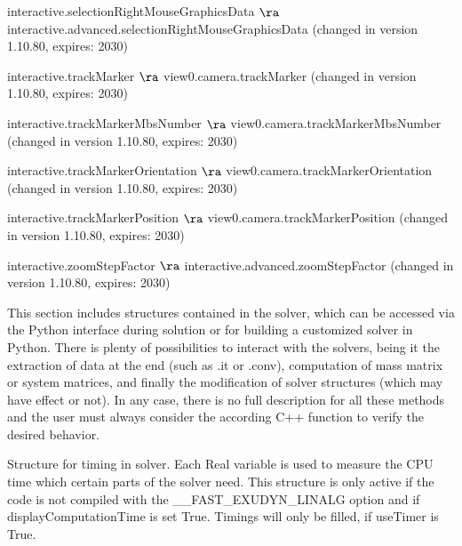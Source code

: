   \item interactive.selectionRightMouseGraphicsData $\ra$ interactive.advanced.selectionRightMouseGraphicsData (changed in version 1.10.80, expires: 2030)
  \item interactive.trackMarker $\ra$ view0.camera.trackMarker (changed in version 1.10.80, expires: 2030)
  \item interactive.trackMarkerMbsNumber $\ra$ view0.camera.trackMarkerMbsNumber (changed in version 1.10.80, expires: 2030)
  \item interactive.trackMarkerOrientation $\ra$ view0.camera.trackMarkerOrientation (changed in version 1.10.80, expires: 2030)
  \item interactive.trackMarkerPosition $\ra$ view0.camera.trackMarkerPosition (changed in version 1.10.80, expires: 2030)
  \item interactive.zoomStepFactor $\ra$ interactive.advanced.zoomStepFactor (changed in version 1.10.80, expires: 2030)
\ei


This section includes structures contained in the solver, which can be accessed via the Python interface during solution or for building a customized solver in Python.
There is plenty of possibilities to interact with the solvers, being it the extraction of data at the end (such as .it or .conv), computation of mass matrix or system matrices, and finally the modification of solver structures (which may have effect or not). In any case, there is no full description for all these methods and the user must always consider the according C++ function to verify the desired behavior.


\label{sec:CSolverTimer}
Structure for timing in solver. Each Real variable is used to measure the CPU time which certain parts of the solver need. This structure is only active if the code is not compiled with the \_\_FAST\_EXUDYN\_LINALG option and if displayComputationTime is set True. Timings will only be filled, if useTimer is True.

